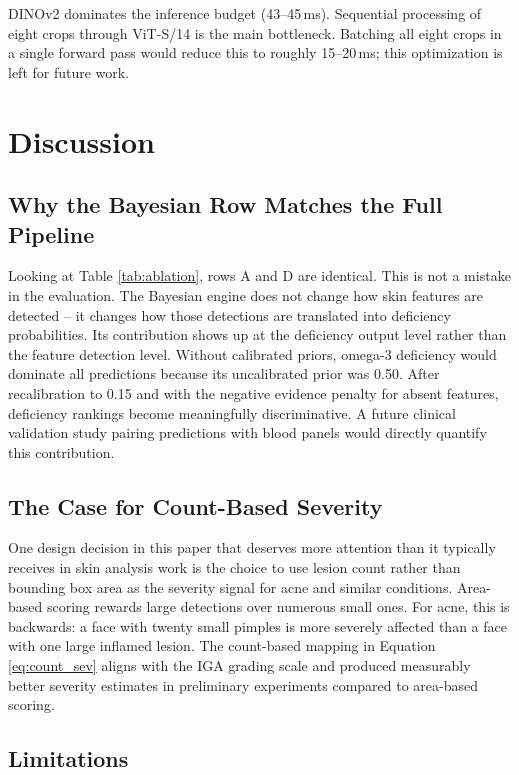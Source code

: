 \documentclass[journal]{IEEEtran}
\begin{document}
DINOv2 dominates the inference budget (43--45\,ms). Sequential processing of
eight crops through ViT-S/14 is the main bottleneck. Batching all eight crops
in a single forward pass would reduce this to roughly 15--20\,ms; this
optimization is left for future work.

\section{Discussion}
\label{sec:discussion}

\subsection{Why the Bayesian Row Matches the Full Pipeline}

Looking at Table \ref{tab:ablation}, rows A and D are identical. This is not
a mistake in the evaluation. The Bayesian engine does not change how skin
features are detected -- it changes how those detections are translated into
deficiency probabilities. Its contribution shows up at the deficiency output
level rather than the feature detection level. Without calibrated priors,
omega-3 deficiency would dominate all predictions because its uncalibrated
prior was 0.50. After recalibration to 0.15 and with the negative evidence
penalty for absent features, deficiency rankings become meaningfully
discriminative. A future clinical validation study pairing predictions with
blood panels would directly quantify this contribution.

\subsection{The Case for Count-Based Severity}

One design decision in this paper that deserves more attention than it typically
receives in skin analysis work is the choice to use lesion count rather than
bounding box area as the severity signal for acne and similar conditions.
Area-based scoring rewards large detections over numerous small ones.
For acne, this is backwards: a face with twenty small pimples is more severely
affected than a face with one large inflamed lesion. The count-based mapping
in Equation \ref{eq:count_sev} aligns with the IGA grading scale \cite{doshi1997}
and produced measurably better severity estimates in preliminary experiments
compared to area-based scoring.

\subsection{Limitations}
\end{document}

